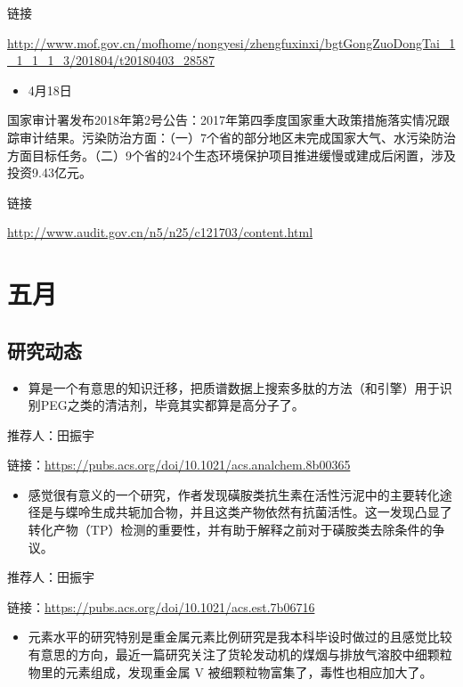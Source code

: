 \documentclass[
]{book}
\providecommand{\tightlist}{%
  \setlength{\itemsep}{0pt}\setlength{\parskip}{0pt}}
\begin{document}
链接

\url{http://www.mof.gov.cn/mofhome/nongyesi/zhengfuxinxi/bgtGongZuoDongTai_1_1_1_1_3/201804/t20180403_28587}

\begin{itemize}
\tightlist
\item
  4月18日
\end{itemize}

国家审计署发布2018年第2号公告：2017年第四季度国家重大政策措施落实情况跟踪审计结果。污染防治方面：（一）7个省的部分地区未完成国家大气、水污染防治方面目标任务。（二）9个省的24个生态环境保护项目推进缓慢或建成后闲置，涉及投资9.43亿元。

链接

\url{http://www.audit.gov.cn/n5/n25/c121703/content.html}

\hypertarget{ux4e94ux6708}{%
\section*{五月}\label{ux4e94ux6708}}

\hypertarget{ux7814ux7a76ux52a8ux6001-6}{%
\subsection*{研究动态}\label{ux7814ux7a76ux52a8ux6001-6}}

\begin{itemize}
\tightlist
\item
  算是一个有意思的知识迁移，把质谱数据上搜索多肽的方法（和引擎）用于识别PEG之类的清洁剂，毕竟其实都算是高分子了。
\end{itemize}

推荐人：田振宇

链接：\url{https://pubs.acs.org/doi/10.1021/acs.analchem.8b00365}

\begin{itemize}
\tightlist
\item
  感觉很有意义的一个研究，作者发现磺胺类抗生素在活性污泥中的主要转化途径是与蝶呤生成共轭加合物，并且这类产物依然有抗菌活性。这一发现凸显了转化产物（TP）检测的重要性，并有助于解释之前对于磺胺类去除条件的争议。
\end{itemize}

推荐人：田振宇

链接：\url{https://pubs.acs.org/doi/10.1021/acs.est.7b06716}

\begin{itemize}
\tightlist
\item
  元素水平的研究特别是重金属元素比例研究是我本科毕设时做过的且感觉比较有意思的方向，最近一篇研究关注了货轮发动机的煤烟与排放气溶胶中细颗粒物里的元素组成，发现重金属 V 被细颗粒物富集了，毒性也相应加大了。
\end{itemize}
\end{document}
